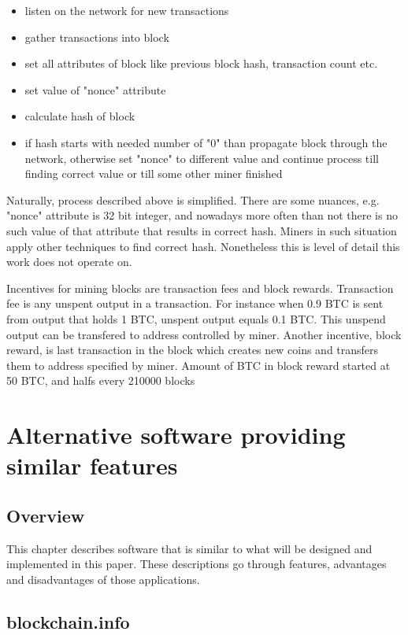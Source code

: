 \documentclass[12pt, en, eng, oneside]{mgr}
\begin{document}
\begin{itemize}
\item
listen on the network for new transactions
\item
gather transactions into block
\item
set all attributes of block like previous block hash, transaction count etc.
\item
set value of "nonce" attribute
\item
calculate hash of block
\item
if hash starts with needed number of "0" than propagate block through the network, otherwise set "nonce" to different value and continue process till finding correct value or till some other miner finished 
\end{itemize}

Naturally, process described above is simplified. There are some nuances, e.g. "nonce" attribute is 32 bit integer, and nowadays more often than not there is no such value of that attribute that results in correct hash. Miners in such situation apply other techniques to find correct hash. Nonetheless this is level of detail this work does not operate on.
 
Incentives for mining blocks are transaction fees and block rewards. Transaction fee is any unspent output in a transaction. For instance when 0.9 BTC is sent from output that holds 1 BTC, unspent output equals 0.1 BTC. This unspend output can be transfered to address controlled by miner.  
Another incentive, block reward, is last transaction in the block which creates new coins and transfers them to address specified by miner. Amount of BTC in block reward started at 50 BTC, and halfs every 210000 blocks \cite{currency-supply}


\chapter{Alternative software providing similar features}

\section{Overview}
This chapter describes software that is similar to what will be designed and implemented in this paper. These descriptions go through features, advantages and disadvantages of those applications. 

\section{blockchain.info}
\end{document}

